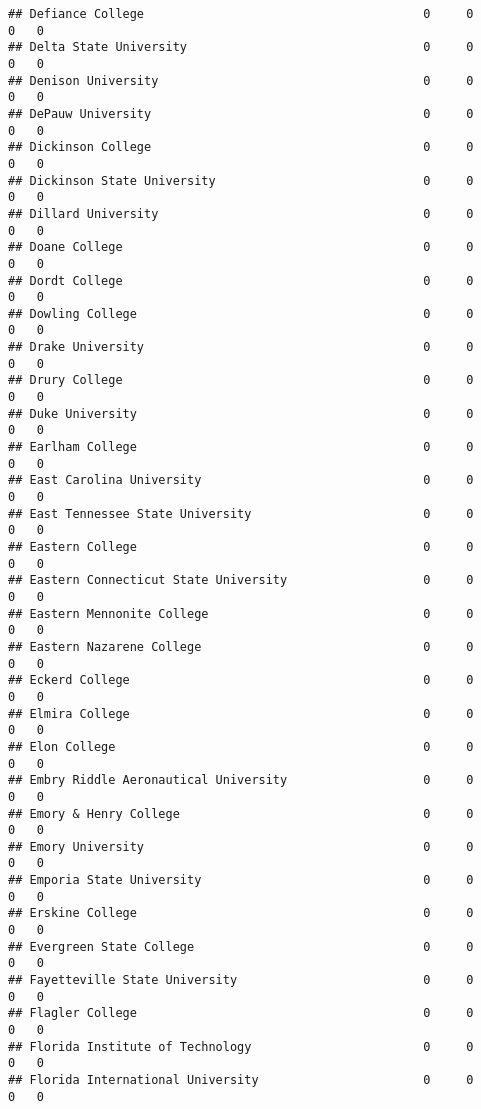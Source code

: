 \documentclass[
]{article}
\begin{document}
\begin{verbatim}
## Defiance College                                       0     0        0   0
## Delta State University                                 0     0        0   0
## Denison University                                     0     0        0   0
## DePauw University                                      0     0        0   0
## Dickinson College                                      0     0        0   0
## Dickinson State University                             0     0        0   0
## Dillard University                                     0     0        0   0
## Doane College                                          0     0        0   0
## Dordt College                                          0     0        0   0
## Dowling College                                        0     0        0   0
## Drake University                                       0     0        0   0
## Drury College                                          0     0        0   0
## Duke University                                        0     0        0   0
## Earlham College                                        0     0        0   0
## East Carolina University                               0     0        0   0
## East Tennessee State University                        0     0        0   0
## Eastern College                                        0     0        0   0
## Eastern Connecticut State University                   0     0        0   0
## Eastern Mennonite College                              0     0        0   0
## Eastern Nazarene College                               0     0        0   0
## Eckerd College                                         0     0        0   0
## Elmira College                                         0     0        0   0
## Elon College                                           0     0        0   0
## Embry Riddle Aeronautical University                   0     0        0   0
## Emory & Henry College                                  0     0        0   0
## Emory University                                       0     0        0   0
## Emporia State University                               0     0        0   0
## Erskine College                                        0     0        0   0
## Evergreen State College                                0     0        0   0
## Fayetteville State University                          0     0        0   0
## Flagler College                                        0     0        0   0
## Florida Institute of Technology                        0     0        0   0
## Florida International University                       0     0        0   0

\end{verbatim}
\end{document}
